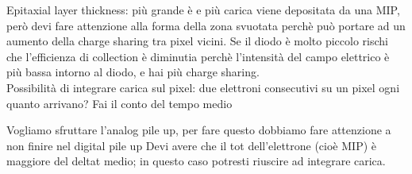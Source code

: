 Epitaxial layer thickness: più grande è e più carica viene depositata da una MIP, però devi fare attenzione alla forma della zona svuotata perchè può portare ad un aumento della charge sharing tra pixel vicini. Se il diodo è molto piccolo rischi che l'efficienza di collection è diminutia perchè l'intensità del campo elettrico è più bassa intorno al diodo, e hai più charge sharing.\\


Possibilità di integrare carica sul pixel: due elettroni consecutivi su un pixel ogni quanto arrivano? Fai il conto del tempo medio

Vogliamo sfruttare l'analog pile up, per fare questo dobbiamo fare attenzione a non finire nel digital pile up
Devi avere che il tot dell'elettrone (cioè MIP) è maggiore del deltat medio; in questo caso potresti riuscire ad integrare carica.


